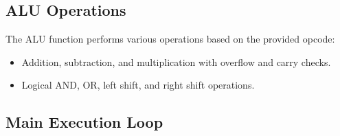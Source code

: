 \documentclass{article}
\begin{document}
\subsection{ALU Operations}

The ALU function performs various operations based on the provided opcode:
\begin{itemize}
    \item Addition, subtraction, and multiplication with overflow and carry checks.
    \item Logical AND, OR, left shift, and right shift operations.
\end{itemize}

\subsection{Main Execution Loop}
\end{document}

